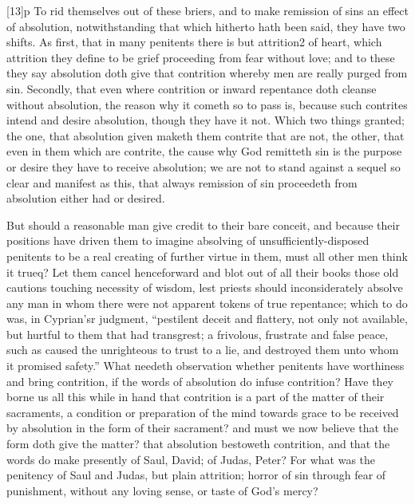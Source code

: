[13]p To rid themselves out of these briers, and to make remission of sins an effect of absolution, notwithstanding that which hitherto hath been said, they have two shifts. As first, that in many penitents there is but attrition2 of heart, which attrition they define to be grief proceeding from fear without love; and to these they say absolution doth give that contrition  whereby men are really purged from sin. Secondly, that even where contrition or inward repentance doth cleanse without absolution, the reason why it cometh so to pass is, because such contrites intend and desire absolution, though they have it not. Which two things granted; the one, that absolution given maketh them contrite that are not, the other, that even in them which are contrite, the cause why God remitteth sin is the purpose or desire they have to receive absolution; we are not to stand against a sequel so clear and manifest as this, that always remission of sin proceedeth from absolution either had or desired.

But should a reasonable man give credit to their bare conceit, and because their positions have driven them to imagine absolving of unsufficiently-disposed penitents to be a real creating of further virtue in them, must all other men think it trueq? Let them cancel henceforward and blot out of all their books those old cautions touching necessity of wisdom, lest priests should inconsiderately absolve any man in whom there were not apparent tokens of true repentance; which to do was, in Cyprian’sr judgment, “pestilent deceit and flattery, not only not available, but hurtful to them that had transgrest; a frivolous, frustrate and false peace, such as caused the unrighteous to trust to a lie, and destroyed them unto whom it promised safety.” What needeth observation whether penitents have worthiness and bring contrition, if the words of absolution do infuse contrition? Have they borne us all this while in hand that contrition is a part of the  matter of their sacraments, a condition or preparation of the mind towards grace to be received by absolution in the form of their sacrament? and must we now believe that the form doth give the matter? that absolution bestoweth contrition, and that the words do make presently of Saul, David; of Judas, Peter? For what was the penitency of Saul and Judas, but plain attrition; horror of sin through fear of punishment, without any loving sense, or taste of God’s mercy?

